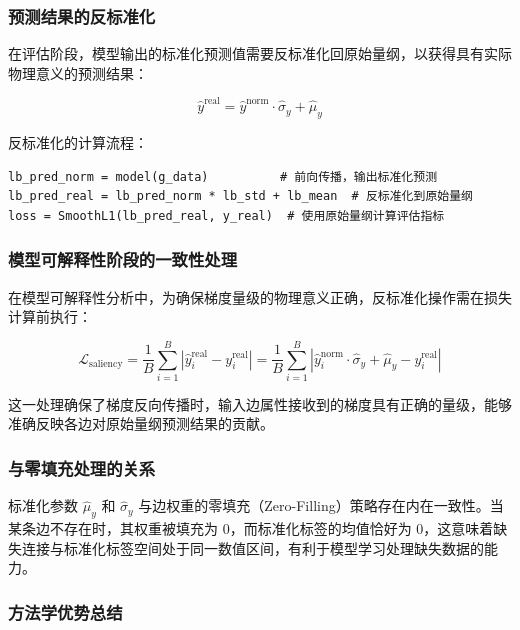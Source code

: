 \documentclass[UTF8, a4paper, 12pt]{article}
\begin{document}
\subsubsection{预测结果的反标准化}

在评估阶段，模型输出的标准化预测值需要反标准化回原始量纲，以获得具有实际物理意义的预测结果：

\begin{equation}
\hat{y}^{\text{real}} = \hat{y}^{\text{norm}} \cdot \hat{\sigma}_y + \hat{\mu}_y
\end{equation}

反标准化的计算流程：

\begin{verbatim}
lb_pred_norm = model(g_data)          # 前向传播，输出标准化预测
lb_pred_real = lb_pred_norm * lb_std + lb_mean  # 反标准化到原始量纲
loss = SmoothL1(lb_pred_real, y_real)  # 使用原始量纲计算评估指标
\end{verbatim}

\subsubsection{模型可解释性阶段的一致性处理}

在模型可解释性分析中，为确保梯度量级的物理意义正确，反标准化操作需在损失计算前执行：

\begin{equation}
\mathcal{L}_{\text{saliency}} = \frac{1}{B} \sum_{i=1}^{B} \left| \hat{y}_i^{\text{real}} - y_i^{\text{real}} \right| = \frac{1}{B} \sum_{i=1}^{B} \left| \hat{y}_i^{\text{norm}} \cdot \hat{\sigma}_y + \hat{\mu}_y - y_i^{\text{real}} \right|
\end{equation}

这一处理确保了梯度反向传播时，输入边属性接收到的梯度具有正确的量级，能够准确反映各边对原始量纲预测结果的贡献。

\subsubsection{与零填充处理的关系}

标准化参数 $\hat{\mu}_y$ 和 $\hat{\sigma}_y$ 与边权重的零填充（Zero-Filling）策略存在内在一致性。当某条边不存在时，其权重被填充为 0，而标准化标签的均值恰好为 0，这意味着缺失连接与标准化标签空间处于同一数值区间，有利于模型学习处理缺失数据的能力。

\subsubsection{方法学优势总结}
\end{document}
